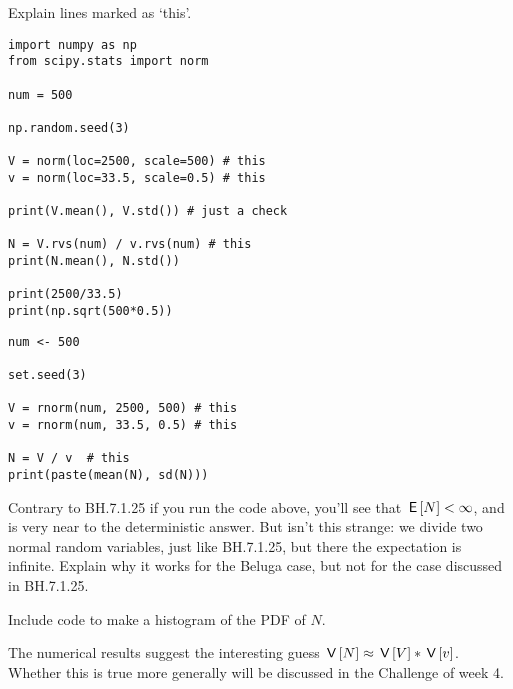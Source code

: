 \begin{exercise}
Explain lines marked as `this'.

\begin{verbatim}
import numpy as np
from scipy.stats import norm

num = 500

np.random.seed(3)

V = norm(loc=2500, scale=500) # this
v = norm(loc=33.5, scale=0.5) # this

print(V.mean(), V.std()) # just a check

N = V.rvs(num) / v.rvs(num) # this
print(N.mean(), N.std())

print(2500/33.5)
print(np.sqrt(500*0.5))
\end{verbatim}

\begin{verbatim}
num <- 500

set.seed(3)

V = rnorm(num, 2500, 500) # this
v = rnorm(num, 33.5, 0.5) # this

N = V / v  # this
print(paste(mean(N), sd(N)))

\end{verbatim}
\end{exercise}


\begin{exercise}
Contrary to BH.7.1.25 if you run the code above, you'll see that $\,\mathsf{E}\left[N\right] < \infty$, and is very near to the deterministic answer.
But isn't this strange: we divide two normal random variables, just like BH.7.1.25, but there the expectation is infinite.
Explain why it works for the Beluga case, but not for the case discussed in BH.7.1.25.
\end{exercise}

\begin{exercise}
Include code to make a histogram of the PDF of $N$.
\end{exercise}



\begin{remark}
The numerical results suggest the interesting guess $\,\mathsf{V}\left[N\right] \approx \,\mathsf{V}\left[V\right] * \,\mathsf{V}\left[v\right]$. Whether this is true more generally will be discussed in the Challenge of week 4. 
\end{remark}
